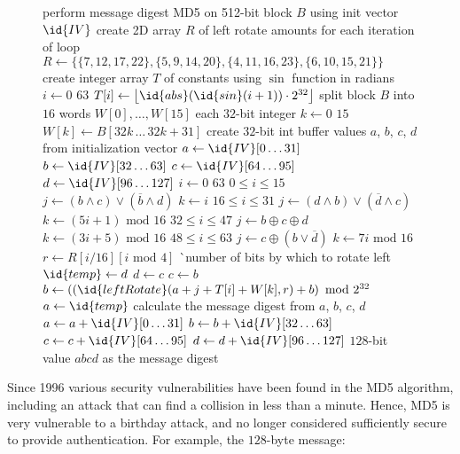 \begin{figure*}
\begin{codebox}
\li \Comment perform message digest MD5 on 512-bit block $B$ using init vector $\id{IV}$
\li \Comment create 2D array $R$ of left rotate amounts for each iteration of loop
\li $R \gets \{\{7, 12, 17, 22\}, \{5, 9, 14, 20\}, \{4, 11, 16, 23\}, \{6, 10, 15, 21\}\}$
\li \Comment create integer array $T$ of constants using $\sin$ function in radians
\li \For $i \gets 0$ \To $63$ \Do
\li    $T[i] \gets \left\lfloor \id{abs}(\id{sin}(i+1))\cdot2^{32}\right\rfloor$
    \End
\li \Comment split block $B$ into $16$ words $W[0], \dots, W[15]$ each $32$-bit integer
\li \For $k \gets 0$ \To $15$ \Do
\li    $W[k] \gets B[32k\, \dots\, 32k+31]$
    \End
\li \Comment create $32$-bit int buffer values $a$, $b$, $c$, $d$ from initialization vector
\li $a \gets \id{IV}[0\dots31]$
\li $b \gets \id{IV}[32\dots63]$
\li $c \gets \id{IV}[64\dots95]$
\li $d \gets \id{IV}[96\dots127]$
\li \For $i \gets 0$ \To $63$ \Do
\li    \If $0\leq i\leq 15$ \Then
\li       $j \gets (b\wedge c)\vee(\overline{b}\wedge d)$
\li       $k \gets i$
\li    \ElseIf $16\leq i\leq 31$ \Then
\li       $j \gets (d\wedge b)\vee(\overline{d}\wedge c)$
\li       $k \gets (5i+1)\mbox{ mod }16$
\li    \ElseIf $32\leq i\leq 47$ \Then
\li       $j \gets b \oplus c \oplus d$
\li       $k \gets (3i+5)\mbox{ mod }16$
\li    \Else \Comment $48\leq i\leq 63$
\li       $j \gets c \oplus(b\vee\overline{d})$
\li       $k \gets 7i\mbox{ mod }16$
       \End
\li    $r \gets R[i/16][i\mbox{ mod }4]$ \`\Comment number of bits by which to rotate left
\li    $\id{temp} \gets d$
\li    $d \gets c$
\li    $c \gets b$
\li    $b \gets \left((\id{leftRotate}(a+j+T[i]+W[k], r)+b\right)\mbox{ mod }2^{32}$
\li    $a \gets \id{temp}$
    \End
\li \Comment calculate the message digest from $a$, $b$, $c$, $d$
\li $a \gets a + \id{IV}[0\dots31]$
\li $b \gets b + \id{IV}[32\dots63]$
\li $c \gets c + \id{IV}[64\dots95]$
\li $d \gets d + \id{IV}[96\dots127]$
\li \Return $128$-bit value $abcd$ as the message digest
\end{codebox}
\end{figure*}

Since 1996 various security vulnerabilities have been found in the MD5 algorithm,
including an attack that can find a collision in less than a minute.
Hence, MD5 is very vulnerable to a birthday attack, and no longer considered sufficiently
secure to provide authentication.
For example, the $128$-byte message:

